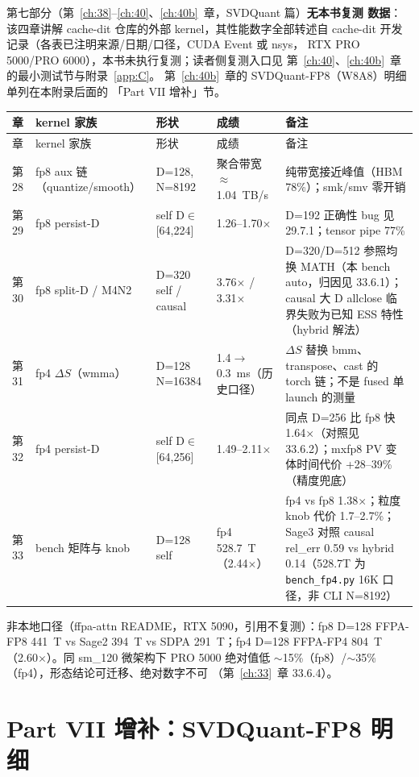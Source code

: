 第七部分（第~\ref{ch:38}--\ref{ch:40}、\ref{ch:40b}~章，SVDQuant 篇）\textbf{无本书复测
数据}：该四章讲解 cache-dit 仓库的外部 kernel，其性能数字全部转述自
cache-dit 开发记录（各表已注明来源/日期/口径，CUDA Event 或 nsys，
RTX PRO 5000/PRO 6000），本书未执行复测；读者侧复测入口见
第~\ref{ch:40}、\ref{ch:40b}~章的最小测试节与附录~\ref{app:C}。
第~\ref{ch:40b}~章的 SVDQuant-FP8（W8A8）明细单列在本附录后面的
「Part VII 增补」节。

\begingroup\small
\begin{longtable}{p{1.6cm}p{3.6cm}p{2.6cm}p{3.0cm}p{3.0cm}}
\toprule
章 & kernel 家族 & 形状 & 成绩 & 备注 \\
\midrule
\endfirsthead
\toprule
章 & kernel 家族 & 形状 & 成绩 & 备注 \\
\midrule
\endhead
\endfoot
\bottomrule
\endlastfoot
第28 & fp8 aux 链（quantize/smooth） & D=128, N=8192 & 聚合带宽 $\approx$1.04~TB/s & 纯带宽接近峰值（HBM 78\%）；smk/smv 零开销 \\
第29 & fp8 persist-D & self D$\in$[64,224] & 1.26--1.70$\times$ & D=192 正确性 bug 见 29.7.1；tensor pipe 77\% \\
第30 & fp8 split-D / M4N2 & D=320 self / causal & 3.76$\times$ / 3.31$\times$ & D=320/D=512 参照均换 MATH（本 bench auto，归因见 33.6.1）；causal 大 D allclose 临界失败为已知 ESS 特性（hybrid 解法） \\
第31 & fp4 $\Delta S$（wmma） & D=128 N=16384 & 1.4$\to$0.3~ms（历史口径） & $\Delta S$ 替换 bmm、transpose、cast 的 torch 链；不是 fused 单 launch 的测量 \\
第32 & fp4 persist-D & self D$\in$[64,256] & 1.49--2.11$\times$ & 同点 D=256 比 fp8 快 1.64$\times$（对照见 33.6.2）；mxfp8 PV 变体时间代价 +28--39\%（精度兜底） \\
第33 & bench 矩阵与 knob & D=128 self & fp4 528.7~T（2.44$\times$） & fp4 vs fp8 1.38$\times$；粒度 knob 代价 1.7--2.7\%；Sage3 对照 causal rel\_err 0.59 vs hybrid 0.14（528.7T 为 \texttt{bench\_fp4.py} 16K 口径，非 CLI N=8192） \\
\end{longtable}
\endgroup

\noindent 非本地口径（ffpa-attn README，RTX 5090，引用不复测）：fp8
D=128 FFPA-FP8 441~T vs Sage2 394~T vs SDPA 291~T；fp4 D=128
FFPA-FP4 804~T（2.60$\times$）。同 sm\_120 微架构下 PRO 5000 绝对值低
$\sim$15\%（fp8）/$\sim$35\%（fp4），形态结论可迁移、绝对数字不可
（第~\ref{ch:33}~章 33.6.4）。

\section{Part VII 增补：SVDQuant-FP8 明细}

